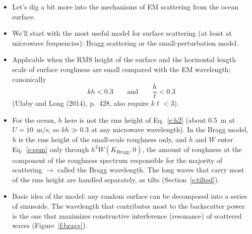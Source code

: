 \documentclass[11pt, oneside]{article}
\begin{document}
\begin{itemize}
	\item Let's dig a bit more into the mechanisms of EM scattering from the ocean surface.
	\item We'll start with the most useful model for surface scattering (at least at microwave frequencies): Bragg scattering or the small-perturbation model.
	\item Applicable when the RMS height of the surface and the horizontal length scale of surface roughness are small compared with the EM wavelength; canonically
	\begin{equation}
		\label{e:spm_valid}
		kh < 0.3 \qquad \text{and} \qquad \frac{h}{\ell} < 0.3
	\end{equation}
	(Ulaby and Long (2014), p.~428, also require $k\ell < 3$).
	\item For the ocean, $h$ here is not the rms height of Eq.~\ref{e:h2} (about 0.5~m at $U = 10$~m/s, so $kh \gg 0.3$ at any microwave wavelength). In the Bragg model, $h$ is the rms height of the small-scale roughness only, and $h$ and $W$ enter Eq.~\ref{e:spm} only through $h^2W(K_\mathrm{Bragg},0)$, the amount of roughness at the component of the roughness spectrum responsible for the majority of scattering $\rightarrow$ called the Bragg wavelength. The long waves that carry most of the rms height are handled separately, as tilts (Section~\ref{s:tilted}).
	\item Basic idea of the model: any random surface can be decomposed into a series of sinusoids. The wavelength that contributes most to the backscatter power is the one that maximizes constructive interference (resonance) of scattered waves (Figure~\ref{f:bragg}).
\end{itemize}
\end{document}
